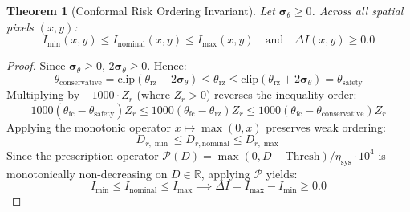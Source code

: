 \documentclass[11pt,a4paper]{article}
\newtheorem{theorem}{Theorem}[section]
\theoremstyle{definition}
\theoremstyle{remark}
\begin{document}
\begin{theorem}[Conformal Risk Ordering Invariant]
Let $\boldsymbol{\sigma}_{\theta} \ge 0$. Across all spatial pixels $(x, y)$:
\begin{equation}
    I_{\min}(x, y) \le I_{\text{nominal}}(x, y) \le I_{\max}(x, y) \quad \text{and} \quad \Delta I(x, y) \ge 0.0
\end{equation}
\end{theorem}
\begin{proof}
Since $\boldsymbol{\sigma}_{\theta} \ge 0$, $2\boldsymbol{\sigma}_{\theta} \ge 0$. Hence:
\begin{equation}
    \theta_{\text{conservative}} = \text{clip}(\theta_{\text{rz}} - 2\boldsymbol{\sigma}_{\theta}) \le \theta_{\text{rz}} \le \text{clip}(\theta_{\text{rz}} + 2\boldsymbol{\sigma}_{\theta}) = \theta_{\text{safety}}
\end{equation}
Multiplying by $-1000 \cdot Z_r$ (where $Z_r > 0$) reverses the inequality order:
\begin{equation}
    1000(\theta_{\text{fc}} - \theta_{\text{safety}})Z_r \le 1000(\theta_{\text{fc}} - \theta_{\text{rz}})Z_r \le 1000(\theta_{\text{fc}} - \theta_{\text{conservative}})Z_r
\end{equation}
Applying the monotonic operator $x \mapsto \max(0, x)$ preserves weak ordering:
\begin{equation}
    D_{r,\min} \le D_{r,\text{nominal}} \le D_{r,\max}
\end{equation}
Since the prescription operator $\mathcal{P}(D) = \max(0, D - \text{Thresh})/\eta_{\text{sys}} \cdot 10^4$ is monotonically non-decreasing on $D \in \mathbb{R}$, applying $\mathcal{P}$ yields:
\begin{equation}
    I_{\min} \le I_{\text{nominal}} \le I_{\max} \implies \Delta I = I_{\max} - I_{\min} \ge 0.0
\end{equation}
\end{proof}
\end{document}
